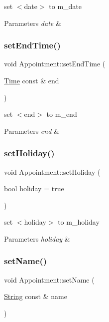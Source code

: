 set $<$date$>$ to m\+\_\+date 
\begin{DoxyParams}{Parameters}
{\em date} & \\
\hline
\end{DoxyParams}
\mbox{\label{classAppointment_a9e6455381eebacbaa3aa98ad3707baac}} 
\subsubsection{\texorpdfstring{set\+End\+Time()}{setEndTime()}}
{\footnotesize\ttfamily void Appointment\+::set\+End\+Time (\begin{DoxyParamCaption}\item[{\hyperlink{classTime}{Time} const \&}]{end }\end{DoxyParamCaption})}

set $<$end$>$ to m\+\_\+end 
\begin{DoxyParams}{Parameters}
{\em end} & \\
\hline
\end{DoxyParams}
\mbox{\label{classAppointment_acd825ab9b1d23efe1bc95dd440030094}} 
\subsubsection{\texorpdfstring{set\+Holiday()}{setHoliday()}}
{\footnotesize\ttfamily void Appointment\+::set\+Holiday (\begin{DoxyParamCaption}\item[{bool}]{holiday = {\ttfamily true} }\end{DoxyParamCaption})}

set $<$holiday$>$ to m\+\_\+holiday 
\begin{DoxyParams}{Parameters}
{\em holiday} & \\
\hline
\end{DoxyParams}
\mbox{\label{classAppointment_a65ff6f9a246d1bf437cb0be725841a84}} 
\subsubsection{\texorpdfstring{set\+Name()}{setName()}}
{\footnotesize\ttfamily void Appointment\+::set\+Name (\begin{DoxyParamCaption}\item[{\hyperlink{classString}{String} const \&}]{name }\end{DoxyParamCaption})}


